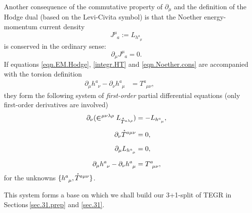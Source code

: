 \documentclass[
10pt, %
a4paper, %
oneside, %
twocolumn,
headinclude,footinclude, %
BCOR5mm, %
]{scrartcl}
\newcommand{\pd}[1]{\partial_{#1}}
\newcommand{\tetrsymbol}{h}
\newcommand{\tetr}[2]{\tetrsymbol^{#1}_{\phantom{#1}#2}}
\newcommand{\D}[1]{\partial_{#1}} %
\newcommand{\Tors}[2]{T^{#1}_{\phantom{#1}#2}}
\newcommand{\Laghodge}{L}%
\newcommand{\LCsymb}{\bm{\in}}    %
\newcommand{\HDT}[1]{\accentset{\star}{T}^{#1}}
\newcommand{\NC}[2]{J^{#2}_{\phantom{#2}#1}}
\begin{document}
	Another consequence of the commutative property of $ \pd{\mu} $ and the definition of the Hodge 
	dual (based on the Levi-Civita symbol) is that the Noether energy-momentum 
	current density
	\begin{equation}\label{eqn.Noether.current}
		\NC{a}{\mu} := \Laghodge_{\tetr{a}{\mu}}
	\end{equation}
	is conserved in the ordinary sense:
	\begin{equation}\label{eqn.Noether.cons}
		\D{\mu} \NC{a}{\mu} = 0.
	\end{equation}
	If  equations \eqref{eqn.EM.Hodge}, \eqref{integr.HT} and \eqref{eqn.Noether.cons} are 
	accompanied 
	with the 
	torsion definition
	\begin{subequations}
		\begin{align}\label{eqn.tetr}
			\D{\mu}\tetr{a}{\nu} - \D{\nu}\tetr{a}{\mu} &= \Tors{a}{\mu\nu},
			\qquad
		\end{align}	
	\end{subequations}
	they form the following system of \emph{first-order} partial differential
	equations (only first-order derivatives are involved)
	\begin{subequations}\label{eqn.1st.order.TEGR}
		\begin{align}	
			\D{\nu}(\LCsymb^{\mu\nu\lambda\rho}\Laghodge_{\HDT{a\lambda\rho}}) 
			&=-\Laghodge_{\tetr{a}{\mu}},\label{eqn.TEGR0.EL}\\[2mm]
			\D{\nu}\HDT{a\mu\nu} & = 0,\label{eqn.TEGR0.integr}\\[2mm]
			\D{\mu}\Laghodge_{\tetr{a}{\mu}} & = 0,\label{eqn.TEGR0.enermomen}\\[2mm]
			\D{\mu}\tetr{a}{\nu} - \D{\nu}\tetr{a}{\mu} &= \Tors{a}{\mu\nu},\label{eqn.TEGR0.tetrad}
		\end{align}
	\end{subequations}
	for the unknowns $ \{\tetr{a}{\mu},\HDT{a\mu\nu}\} $.
	
	This system forms a base on which we shall build our 3+1-split of TEGR in 
	Sections\,\ref{sec.31.prep} and \ref{sec.31}.
	
	
	
	
	
\end{document}
